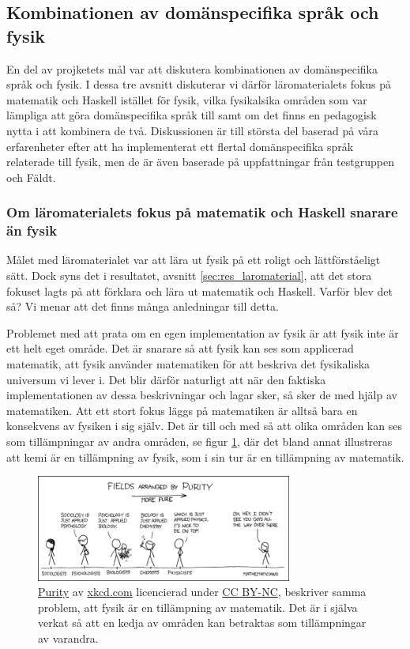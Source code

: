 \begin{draft}

\subsection{Kombinationen av domänspecifika språk och fysik}

En del av projketets mål var att diskutera kombinationen av
domänspecifika språk och fysik. I dessa tre avsnitt diskuterar vi därför
läromaterialets fokus på matematik och Haskell istället för fysik, vilka
fysikalsika områden som var lämpliga att göra domänspecifika språk till samt om
det finns en pedagogisk nytta i att kombinera de två. Diskussionen är till
största del baserad på våra erfarenheter efter att ha implementerat ett flertal
domänspecifika språk relaterade till fysik, men de är även baserade på
uppfattningar från testgruppen och Fäldt.

\subsubsection{Om läromaterialets fokus på matematik och Haskell snarare än
fysik}

Målet med läromaterialet var att lära ut fysik på ett roligt och lättförståeligt
sätt. Dock syns det i resultatet, avsnitt \ref{sec:res_laromaterial}, att det stora fokuset lagts på att
förklara och lära ut matematik och Haskell. Varför blev det så? Vi menar att det
finns många anledningar till detta. 

Problemet med att prata om en egen implementation av fysik är att fysik inte är
ett helt eget område. Det är snarare så att fysik kan ses som applicerad
matematik, att fysik använder matematiken för att beskriva det fysikaliska
universum vi lever i. Det blir därför naturligt att när den faktiska
implementationen av dessa beskrivningar och lagar sker, så sker de med hjälp av
matematiken. Att ett stort fokus läggs på matematiken är alltså bara en
konsekvens av fysiken i sig själv. Det är till och med så att olika områden kan ses som tillämpningar av andra områden, se figur \ref{fig:xkcd}, där det bland annat illustreras att kemi är en tillämpning av fysik, som i sin tur är en tillämpning av matematik.

\begin{figure}[tph]
  \centering
  \includegraphics[width=0.75\textwidth]{figure/purity.png}
  \caption{\href{https://xkcd.com/435/}{Purity} av \href{https://xkcd.com}{xkcd.com} licencierad under
  \href{https://creativecommons.org/licenses/by-nc/2.5/}{CC BY-NC}, beskriver samma problem, att fysik är en tillämpning av matematik. Det är i själva verkat så att en kedja av områden kan betraktas som tillämpningar av varandra.}
  \label{fig:xkcd}
\end{figure}


\end{draft}
